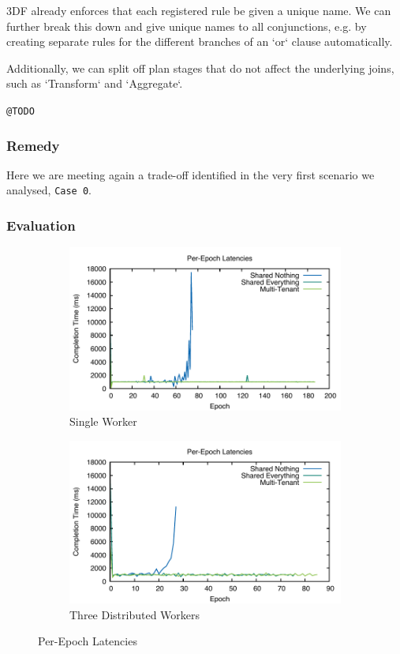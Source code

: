 \documentclass[../catalog.tex]{subfiles}
\begin{document}
3DF already enforces that each registered rule be given a unique
name. We can further break this down and give unique names to all
conjunctions, e.g. by creating separate rules for the different
branches of an `or` clause automatically.

Additionally, we can split off plan stages that do not affect the
underlying joins, such as `Transform` and `Aggregate`.

\texttt{@TODO}

\subsubsection{Remedy}

Here we are meeting again a trade-off identified in the very first
scenario we analysed, \texttt{Case 0}.

\subsubsection{Evaluation}

\begin{figure}[h!]
  \begin{subfigure}{.5\textwidth}
    \includegraphics[width=1.0\linewidth]{results/multitenant_w1_p1/times}
    \caption{Single Worker}
  \end{subfigure}
  \begin{subfigure}{.5\textwidth}
    \includegraphics[width=1.0\linewidth]{results/multitenant_w1_p3/times}
    \caption{Three Distributed Workers}
  \end{subfigure}

  \caption{Per-Epoch Latencies}
\end{figure}
\end{document}
